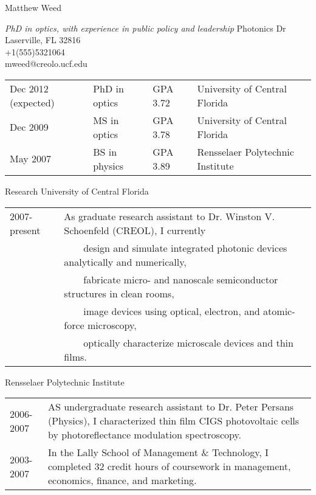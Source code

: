 \documentclass[a4paper]{article}
\newcommand{\name}[1]{\huge #1 \doublespacing}
\newcommand{\occupation}[1]{\vspace{0.125in}\large \textit{#1}}
\newcommand{\infor}[4]{\singlespacing \vspace{-1.2in} \flushright #1 \\ #2\\ \vspace{0.1in} #3 \\ #4 \flushleft \onehalfspacing}
\newcommand{\eduitem}[4]{#1 \hspace{10mm} & #2 & #3 \hspace{3mm} & #4}
\newcommand*{\bluebullet}{\textcolor{lucbullet}{$\blacksquare$}}
\newcommand{\tabitem}{~~\llap{\bluebullet}~~}
\renewcommand{\section}[2]{\LARGE #1 \hspace{0.95in} \large #2 \normalsize \vspace{0.25in}}
\begin{document}
\name{Matthew Weed}

\occupation{PhD in optics, with experience in public policy and leadership}
\small
\infor{4071 Photonics Dr}{Laserville, FL 32816}{+1(555)5321064}{mweed@creolo.ucf.edu}

\normalsize
\vspace{5mm}
\begin{tabular}{l l l l}
\eduitem{Dec 2012 (expected)}{PhD in optics}{GPA 3.72}{University of Central Florida}\\ 
\eduitem{Dec 2009}{MS in optics}{GPA 3.78}{University of Central Florida}\\
\eduitem{May 2007}{BS in physics}{GPA 3.89}{Rensselaer Polytechnic Institute}
\end{tabular}
\vspace{0.5in}

\section{Research}{University of Central Florida}

\begin{tabular}[t]{l@{\hspace{1.1in}} m{}}
	2007-present & As graduate research assistant to Dr. Winston V. Schoenfeld (CREOL), I currently\\
	 	     & \tabitem design and simulate integrated photonic devices analytically and numerically,\\
		     & \tabitem fabricate micro- and nanoscale semiconductor structures in clean rooms,\\ 
		     & \tabitem image devices using optical, electron, and atomic-force microscopy,\\
		     & \tabitem optically characterize microscale devices and thin films. 
\end{tabular}

\vspace{0.5in}

\section{}{\hspace{0.95in}Rensselaer Polytechnic Institute}

\begin{tabular}[t]{l@{\hspace{1.25in}} m{}}
	2006-2007 & AS undergraduate research assistant to Dr. Peter Persans (Physics), I characterized thin film CIGS photovoltaic cells by photoreflectance modulation spectroscopy.\\
	2003-2007 & In the Lally School of Management \& Technology, I completed 32 credit hours of coursework in management, economics, finance, and marketing.
\end{tabular}
\end{document}
